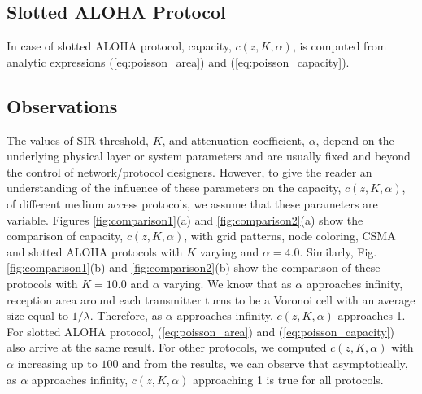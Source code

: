 \documentclass[12pt,english]{article}
\begin{document}
\subsection{Slotted ALOHA Protocol}

In case of slotted ALOHA protocol, capacity, $c(z,K,\alpha)$, is computed from analytic expressions (\ref{eq:poisson_area}) and (\ref{eq:poisson_capacity}).

\begin{figure*}[!t]
\centering
{}
\caption{Capacity, $c(z,K,\alpha)$, of grid pattern (triangular, square and hexagonal) based protocols.
\label{fig:comparison1}}
\end{figure*}

\begin{figure*}[!t]
\centering
{}
\caption{Capacity, $c(z,K,\alpha)$, of triangular grid (from Fig. \ref{fig:comparison1}), node coloring, CSMA and slotted ALOHA protocols.
\label{fig:comparison2}}
\end{figure*}

\subsection{Observations}

The values of SIR threshold, $K$, and attenuation coefficient, $\alpha$, depend on the underlying physical layer or system parameters and are usually fixed and beyond the control of network/protocol designers. However, to give the reader an understanding of the influence of these parameters on the capacity, $c(z,K,\alpha)$, of different medium access protocols, we assume that these parameters are variable. Figures \ref{fig:comparison1}(a) and \ref{fig:comparison2}(a) show the comparison of capacity, $c(z,K,\alpha)$, with grid patterns, node coloring, CSMA and slotted ALOHA protocols with $K$ varying and \mbox{$\alpha=4.0$}. Similarly, Fig. \ref{fig:comparison1}(b) and \ref{fig:comparison2}(b) show the comparison of these protocols with \mbox{$K=10.0$} and $\alpha$ varying. We know that as $\alpha$ approaches infinity, reception area around each transmitter turns to be a Voronoi cell with an average size equal to $1/\lambda$. Therefore, as $\alpha$ approaches infinity, $c(z,K,\alpha)$ approaches 1. For slotted ALOHA protocol, (\ref{eq:poisson_area}) and (\ref{eq:poisson_capacity}) also arrive at the same result. For other protocols, we computed $c(z,K,\alpha)$ with $\alpha$ increasing up to $100$ and from the results, we can observe that asymptotically, as $\alpha$ approaches infinity, $c(z,K,\alpha)$ approaching 1 is true for all protocols. 
\end{document}
